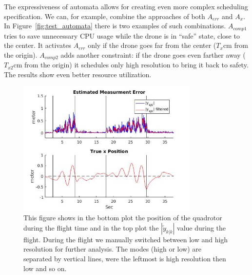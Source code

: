 \documentclass{sig-alternate-ipsn13}
\begin{document}
The expressiveness of automata allows for creating even more complex scheduling specification. We can, for example, combine the approaches of both $A_{err}$ and $A_{x}$.
In Figure~\ref{fig:test_automata} there is two examples of such combinations. $A_{comp1}$ tries to save unnecessary CPU usage while the drone is in ``safe'' state, close to the center. It activates $A_{err}$ only if the drone goes far from the center ($T_{x}$cm from the origin).
$A_{comp2}$ adds another constraint: if the drone goes even farther away ($T_{x2}$cm from the origin) it schedules only high resolution to bring it back to safety.
The results show even better resource utilization.

\begin{figure}[htbp]
    \centerline{\includegraphics[width=90mm]{errorVsPosition.jpg}}
    \caption{This figure shows in the bottom plot the position of the quadrotor during the flight time and in the top plot the $\left| \tilde{y}_{k|k} \right|$ value during the flight. During the flight we manually switched between low and high resolution for further analysis. The modes (high or low) are separated by vertical lines, were the leftmost is high resolution then low and so on.}
    \label{fig:testPlot}
\end{figure}
\end{document}
